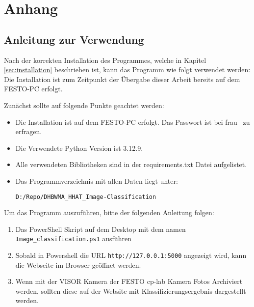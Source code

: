 \appendix
\renewcommand{\thesection}{\Alph{section}} %
\renewcommand{\thesubsection}{\thesection.\arabic{subsection}} %
\renewcommand*{\sectionmark}[1]{\markright{Anhang \thesection: #1}}

\chapter{Anhang}
	
\section{Anleitung zur Verwendung} \label{subsec:anleitung_zur_verwendung}

Nach der korrekten Installation des Programmes, welche in Kapitel \ref{sec:installation} beschrieben ist, kann das Programm wie folgt verwendet werden:
Die Installation ist zum Zeitpunkt der Übergabe dieser Arbeit bereits auf dem FESTO-PC erfolgt. 


Zunächst sollte auf folgende Punkte geachtet werden:
\begin{itemize}
    \item Die Installation ist auf dem FESTO-PC erfolgt. Das Passwort ist bei frau \BetreuerDHBW \ zu erfragen.
    \item Die Verwendete Python Version ist 3.12.9.
    \item Alle verwendeten Bibliotheken sind in der requirements.txt Datei aufgelistet.
    \item Das Programmverzeichnis mit allen Daten liegt unter: 
    
    \texttt{D:/Repo/DHBWMA\_HHAT\_Image-Classification}
\end{itemize}

Um das Programm auszuführen, bitte der folgenden Anleitung folgen:

\begin{enumerate}
    \item Das PowerShell Skript auf dem Desktop mit dem namen \texttt{Image\_classification.ps1} ausführen
    \item Sobald in Powershell die URL \texttt{http://127.0.0.1:5000} angezeigt wird, kann die Webseite im Browser geöffnet werden.
    \item Wenn mit der VISOR Kamera der FESTO \ac{cp-lab} Kamera Fotos Archiviert werden, sollten diese auf der Website mit Klassifizierungsergebnis dargestellt werden. 
\end{enumerate}

